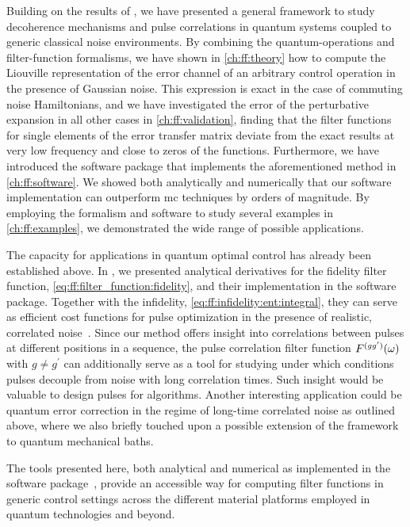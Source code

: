 Building on the results of , we have presented a general framework to study decoherence mechanisms and pulse correlations in quantum systems coupled to generic classical noise environments.
By combining the quantum-operations and filter-function formalisms, we have shown in \cref{ch:ff:theory} how to compute the Liouville representation of the error channel of an arbitrary control operation in the presence of Gaussian noise.
This expression is exact in the case of commuting noise Hamiltonians, and we have investigated the error of the perturbative expansion in all other cases in \cref{ch:ff:validation}, finding that the filter functions for single elements of the error transfer matrix deviate from the exact results at very low frequency and close to zeros of the functions.
Furthermore, we have introduced the \filterfunctions \python software package that implements the aforementioned method in \cref{ch:ff:software}.
We showed both analytically and numerically that our software implementation can outperform \acrlong{mc} techniques by orders of magnitude.
By employing the formalism and software to study several examples in \cref{ch:ff:examples}, we demonstrated the wide range of possible applications.

The capacity for applications in quantum optimal control has already been established above.
In , we presented analytical derivatives for the fidelity filter function, \cref{eq:ff:filter_function:fidelity}, and their implementation in the software package.
Together with the infidelity, \cref{eq:ff:infidelity:ent:integral}, they can serve as efficient cost functions for pulse optimization in the presence of realistic, correlated noise~\cite{Teske2022}.
Since our method offers insight into correlations between pulses at different positions in a sequence, the pulse correlation filter function $F^{(gg^\prime)}(\omega)$ with $g\neq g^\prime$ can additionally serve as a tool for studying under which conditions pulses decouple from noise with long correlation times.
Such insight would be valuable to design pulses for algorithms.
Another interesting application could be quantum error correction in the regime of long-time correlated noise as outlined above, where we also briefly touched upon a possible extension of the framework to quantum mechanical baths.

The tools presented here, both analytical and numerical as implemented in the \filterfunctions software package~\cite{Hangleiter_ff}, provide an accessible way for computing filter functions in generic control settings across the different material platforms employed in quantum technologies and beyond.

